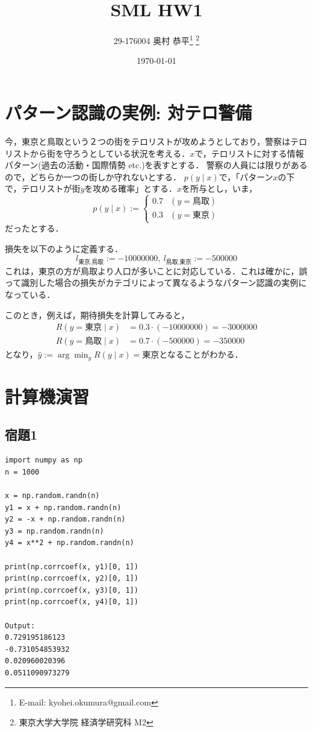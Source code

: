 \documentclass[11pt,a4paper,dvipdfmx]{article}
\theoremstyle{plain}
\renewcommand{\hat}{\widehat}
\newcommand{\1}{\mbox{1}\hspace{-0.25em}\mbox{l}}
\begin{document}
\title{SML HW1}
\author{29-176004 奥村 恭平{\footnote{E-mail: kyohei.okumura@gmail.com}
\footnote{東京大学大学院 経済学研究科 M2}
}}
\date{\today}
\maketitle


\section{パターン認識の実例: 対テロ警備}
今，東京と鳥取という２つの街をテロリストが攻めようとしており，警察はテロリストから街を守ろうとしている状況を考える．$x$で，テロリストに対する情報パターン(過去の活動・国際情勢 etc.)を表すとする．
警察の人員には限りがあるので，どちらか一つの街しか守れないとする．
$p(y \mid x )$で，「パターン$x$の下で，テロリストが街$y$を攻める確率」とする．$x$を所与とし，いま，
$$p(y \mid x) :=
\begin{cases}
	0.7 & (y = \text{鳥取}) \\
	0.3 & (y = \text{東京})
\end{cases}
$$
だったとする．

損失を以下のように定義する．
$$
l_{\text{東京}, \text{鳥取}} := -10000000, \ 
l_{\text{鳥取}, \text{東京}} := -500000
$$
これは，東京の方が鳥取より人口が多いことに対応している．これは確かに，誤って識別した場合の損失がカテゴリによって異なるようなパターン認識の実例になっている．

このとき，例えば，期待損失を計算してみると，
\begin{align*}
	R(y = \text{東京} \mid x) &= 0.3 \cdot (- 10000000) = - 3000000 \\
	R(y = \text{鳥取} \mid x) &= 0.7 \cdot (- 500000) = - 350000
\end{align*}
となり，$\hat{y} := \arg \min_y R(y \mid x) = \text{東京}$となることがわかる．


\section{計算機演習}
\subsection{宿題1}
\begin{lstlisting}[caption=correlation]
import numpy as np
n = 1000

x = np.random.randn(n)
y1 = x + np.random.randn(n)
y2 = -x + np.random.randn(n)
y3 = np.random.randn(n)
y4 = x**2 + np.random.randn(n)

print(np.corrcoef(x, y1)[0, 1])
print(np.corrcoef(x, y2)[0, 1])
print(np.corrcoef(x, y3)[0, 1])
print(np.corrcoef(x, y4)[0, 1])

Output:
0.729195186123
-0.731054853932
0.020960020396
0.0511090973279
\end{lstlisting}
\end{document}
